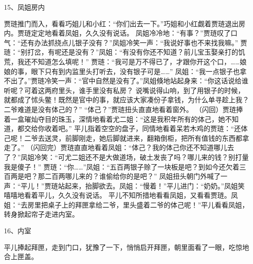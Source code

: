 15、凤姐房内\par
贾琏推门而入，看看巧姐儿和小红：“你们出去一下。”巧姐和小红觑着贾琏退出房内。贾琏定定地看着凤姐，久久没有说话。 
凤姐冷冷地：“有事？”贾琏叹了口气：“还有办法抓挠点儿银子没有？”凤姐冷笑一声：“我说好事也不来找我嘛。”
贾琏：“别打岔，有呢还是没有？”凤姐：“有没有你还不知道？前儿宝玉娶亲打的饥荒，我还不知道怎么填呢！”
贾琏：“我可是万不得已了，才跟你开这个口，……娘娘的事，眼下只有到内监里头打听去，没有银子可是……”
凤姐：“我一点银子也拿不出了。”贾琏冷笑一声：“官中自然是没有了。”凤姐倏地站起身来：“你这话说给谁听呢？可着这两府里头，谁手里没有私房？
说嘴说得山响，到了用银子的时候，就都成了怵头鳖！既然是官中的事，就应该大家凑份子拿钱，为什么单寻趁上我？二爷难道是没有体己的？”
“体己？”贾琏扭头直直地看着窗外。
（闪回）贾琏捧着一盒璀灿夺目的珠玉，深情地看着尤二姐：“这是我积年所有的体己，她不知道，都交给你收着吧。”
平儿指着空空的盘子，同情地看着呆若木鸡的贾琏：“还体己呢！二爷去送灵，前脚刚走，她后脚就进来，翻箱倒柜，把所有值钱的东西都拿走了。”
（闪回完）贾琏直直地看着凤姐：“体己？我的体己你还不知道哪儿去了？”凤姐冷笑：“可尤二姐还不是大做道场，破土发丧了吗？哪儿来的钱？别打量我是傻子！”
贾琏：“你……”凤姐：“五百两银子赊了一块板是吧？到如今还欠着三百两是吧？那二百两哪儿来的？谁偷给你的是吧？”
凤姐扭头朝门外喊了一声：“平儿！”贾琏站起来，抬脚欲去。凤姐：“慢着！”平儿进门：“奶奶。”凤姐笑嘻嘻地看着平儿，久久没有说话。
平儿不知所措地看看凤姐，又看看贾琏。凤姐：“去房里把桌子上的拜匣拿给二爷，里头盛着二爷的体己呢！”平儿看看凤姐，转身掀起帘子走进内室。

16、内室\par
平儿捧起拜匣，走到门口，犹豫了一下，悄悄启开拜匣，朝里面看了一眼，吃惊地合上匣盖。

